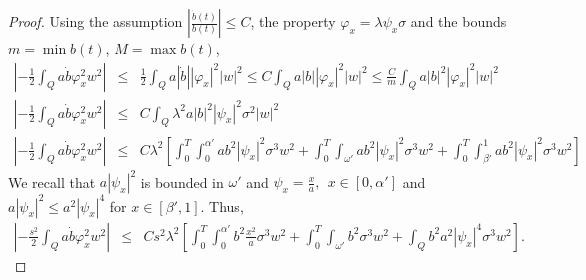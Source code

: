 \documentclass[11pt,oneside,a4papper]{osajnl}
\begin{document}
\begin{proof}
Using the assumption $\left|\frac{\dot{b}(t)}{b(t)} \right|\leq C$, the property $\varphi_x=\lambda \psi_x \sigma$ and the bounds  $m=\min b(t)$, $M=\max b(t)$,  
\begin{eqnarray*}
	\left|- \frac{1}{2} \int_{Q}a\dot{b}\varphi_{x}^2 w^2 \right|&\leq &\frac{1}{2}\int_{Q}a|\dot{b}||\varphi_{x}|^2 |w|^2\leq  C\int_{Q}a|b||\varphi_{x}|^2 |w|^2\leq  \frac{C}{m}\int_{Q}a|b|^2|\varphi_{x}|^2 |w|^2\\
	\left|- \frac{1}{2} \int_{Q}a\dot{b}\varphi_{x}^2 w^2 \right|&\leq & C\int_{Q}\lambda^2a|b|^2|\psi_{x}|^2 \sigma^2|w|^2\\
		\left|- \frac{1}{2} \int_{Q}a\dot{b}\varphi_{x}^2 w^2 \right|&\leq &C\lambda^2\left[ \int_{0}^{T} \int_{0}^{\alpha'} ab^2 |\psi_x|^2 \sigma^3 w^2 +  \int_{0}^{T} \int_{\omega'}ab^2 |\psi_x|^2 \sigma^3 w^2+\int_{0}^{T} \int_{\beta'}^{1}ab^2 |\psi_x|^2 \sigma^3 w^2   \right]
\end{eqnarray*}
We recall that  $a|\psi_x|^2$ is bounded in $\omega'$ and $\psi_x=\frac{x}{a}, \ \ x\in [0,\alpha']$ and  $a|\psi_x|^2\leq a^2|\psi_x|^4$ for $x\in[\beta',1]$. Thus,
		\begin{eqnarray*}
			\left|- \frac{s^2}{2} \int_{Q}a\dot{b}\varphi_{x}^2 w^2 \right|&\leq &Cs^2\lambda^2\left[ \int_0^T \int_0^{\alpha'} b^2 \frac{x^2}{a} \sigma^3 w^2 + \int_0^T\int_{\omega'} b^2 \sigma^3 w^2 + \int_Q b^2 a^2 |\psi_x|^4 \sigma^3 w^2   \right].
	\end{eqnarray*}	
\end{proof}
\end{document}
